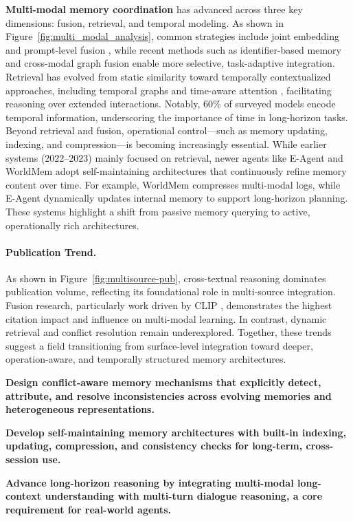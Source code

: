 \documentclass[manuscript,screen]{acmart}
\begin{document}
\textbf{Multi-modal memory coordination} has advanced across three key dimensions: fusion, retrieval, and temporal modeling. As shown in Figure~\ref{fig:multi_modal_analysis}, common strategies include joint embedding \citep{he2024ma, zhou2024vista, ma-etal-2022-unitranser, wang2025new, wang2025mmlongbench} and prompt-level fusion \citep{wang2023lifelongmemory, guo2024embodied}, while recent methods such as identifier-based memory \citep{li-etal-2024-generative} and cross-modal graph fusion \citep{nguyen-etal-2023-conversation} enable more selective, task-adaptive integration. Retrieval has evolved from static similarity toward temporally contextualized approaches, including temporal graphs and time-aware attention \citep{xiao2025worldmem}, facilitating reasoning over extended interactions. Notably, 60\% of surveyed models encode temporal information, underscoring the importance of time in long-horizon tasks. Beyond retrieval and fusion, operational control—such as memory updating, indexing, and compression—is becoming increasingly essential. While earlier systems (2022–2023) mainly focused on retrieval, newer agents like E-Agent \citep{glocker2025llm} and WorldMem \citep{xiao2025worldmem} adopt self-maintaining architectures that continuously refine memory content over time. For example, WorldMem compresses multi-modal logs, while E-Agent dynamically updates internal memory to support long-horizon planning. These systems highlight a shift from passive memory querying to active, operationally rich architectures.

\paragraph{Publication Trend.} As shown in Figure~\ref{fig:multisource-pub}, cross-textual reasoning dominates publication volume, reflecting its foundational role in multi-source integration. Fusion research, particularly work driven by CLIP \citep{pmlr-v139-radford21a}, demonstrates the highest citation impact and influence on multi-modal learning. In contrast, dynamic retrieval and conflict resolution remain underexplored. Together, these trends suggest a field transitioning from surface-level integration toward deeper, operation-aware, and temporally structured memory architectures.

\begin{tcolorbox}[
    colback=efcfef!40!white,
    colframe=black!50,
    arc=6pt,
    boxrule=0.8pt,
    width=\linewidth,
    enhanced,
    left=4pt,
    right=4pt,
    top=4pt,
    bottom=4pt,
    fontupper=\small\bfseries
]
\lightbulb \textbf{Design conflict-aware memory mechanisms that explicitly detect, attribute, and resolve inconsistencies across evolving memories and heterogeneous representations.}

\lightbulb \textbf{Develop self-maintaining memory architectures with built-in indexing, updating, compression, and consistency checks for long-term, cross-session use.}

\lightbulb \textbf{Advance long-horizon reasoning by integrating multi-modal long-context understanding with multi-turn dialogue reasoning, a core requirement for real-world agents.}
\end{tcolorbox}
\end{document}
